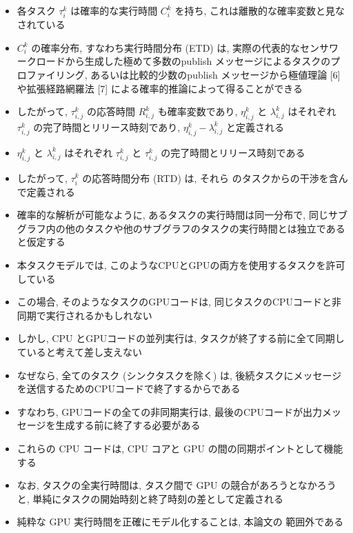 \begin{frame}{}
    \begin{itemize}
        \item 各タスク $\tau_{i}^{k}$ は確率的な実行時間 $C_{i}^{k}$ を持ち, これは離散的な確率変数と見なされている
        \item $C_{i}^{k}$ の確率分布, すなわち実行時間分布 (ETD) は, 実際の代表的なセンサワークロードから生成した極めて多数のpublish メッセージによるタスクのプロファイリング, あるいは比較的少数のpublish メッセージから極値理論 [6]や拡張経路網羅法 [7] による確率的推論によって得ることができる
        \item したがって, $\tau_{i, j}^{k}$ の応答時間 $R_{i, j}^{k}$ も確率変数であり, $\eta_{i, j}^{k}$ と $\lambda_{i, j}^{k}$ はそれぞれ $\tau_{i, j}^{k}$ の完了時間とリリース時刻であり, $\eta_{i, j}^{k}-\lambda_{i, j}^{k}$ と定義される
        \item $\eta_{i, j}^{k}$ と $\lambda_{i, j}^{k}$ はそれぞれ $\tau_{i, j}^{k}$ と $\tau_{i, j}^{k}$ の完了時間とリリース時刻である
        \item したがって, $\tau_{i}^{k}$ の応答時間分布 (RTD) は, それら のタスクからの干渉を含んで定義される
        \item 確率的な解析が可能なように, あるタスクの実行時間は同一分布で, 同じサブグラフ内の他のタスクや他のサブグラフのタスクの実行時間とは独立であると仮定する
    \end{itemize}
\end{frame}

\begin{frame}{}
    \begin{itemize}
        \item 本タスクモデルでは, このようなCPUとGPUの両方を使用するタスクを許可している
        \item この場合, そのようなタスクのGPUコードは, 同じタスクのCPUコードと非同期で実行されるかもしれない
        \item しかし, $\mathrm{CPU}$ とGPUコードの並列実行は, タスクが終了する前に全て同期していると考えて差し支えない
        \item なぜなら, 全てのタスク (シンクタスクを除く) は, 後続タスクにメッセージを送信するためのCPUコードで終了するからである
        \item すなわち, GPUコードの全ての非同期実行は, 最後のCPUコードが出力メッセージを生成する前に終了する必要がある
        \item これらの CPU コードは, CPU コアと GPU の間の同期ポイントとして機能する
        \item なお, タスクの全実行時間は, タスク間で GPU の競合があろうとなかろうと, 単純にタスクの開始時刻と終了時刻の差として定義される
        \item 純粋な GPU 実行時間を正確にモデル化することは, 本論文の 範囲外である
    \end{itemize}
\end{frame}

